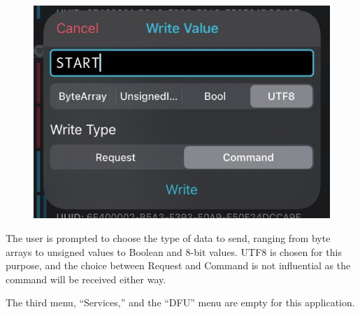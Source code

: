 \documentclass{Configuration_Files/PoliMi3i_thesis}
\begin{document}
\begin{figure}[H]
    \centering
    \includegraphics[scale=0.3]{Multicentral/14.png}
    \label{fig:nrf_connect_commands}
\end{figure}

The user is prompted to choose the type of data to send, ranging from byte arrays to unsigned values to Boolean and 8-bit values. UTF8 is chosen for this purpose, and the choice between Request and Command is not influential as the command will be received either way.

The third menu, “Services,” and the “DFU” menu are empty for this application.
\end{document}
